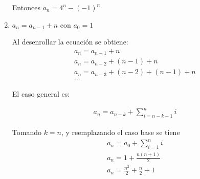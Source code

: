 \documentclass[dcc,uchile,sol]{fcfmcourse}
\begin{document}
\begin{problems}
\begin{enumerate}
    Entonces $a_n = 4^n - (-1)^n$\\
    
    
    \item $a_n = a_{n-1} + n$ con $a_0 = 1$
    
    Al desenrollar la ecuación se obtiene:
    \begin{align*}
    a_n = a_{n-1} + n \\
    a_n = a_{n-2} + (n-1) + n \\
    a_n = a_{n-3} + (n-2) + (n-1) + n \\
    \dots
    \end{align*}
    
    El caso general es:
    
    \begin{align*}
    a_n = a_{n-k} + \sum_{i = n-k+1}^{n} i 
    \end{align*}
    
    Tomando $k = n$, y reemplazando el caso base se tiene
    \begin{align*}
    a_n = a_0 + \sum_{i = 1}^{n} i \\
    a_n = 1 + \frac{n(n+1)}{2} \\
    a_n = \frac{n^2}{2} + \frac{n}{2} + 1
    \end{align*}
    
\end{enumerate}



\end{problems}
\end{document}
